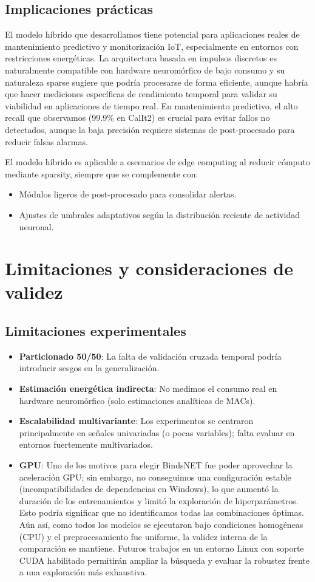 \subsection{Implicaciones prácticas}
El modelo híbrido que desarrollamos tiene potencial para aplicaciones reales de mantenimiento predictivo y monitorización IoT, especialmente en entornos con restricciones energéticas. La arquitectura basada en impulsos discretos es naturalmente compatible con hardware neuromórfico de bajo consumo y su naturaleza sparse sugiere que podría procesarse de forma eficiente, aunque habría que hacer mediciones específicas de rendimiento temporal para validar su viabilidad en aplicaciones de tiempo real. En mantenimiento predictivo, el alto recall que observamos (99.9\% en CalIt2) es crucial para evitar fallos no detectados, aunque la baja precisión requiere sistemas de post-procesado para reducir falsas alarmas.

El modelo híbrido es aplicable a escenarios de edge computing al reducir cómputo mediante sparsity, siempre que se complemente con:
\begin{itemize}
    \item Módulos ligeros de post-procesado para consolidar alertas.
    \item Ajustes de umbrales adaptativos según la distribución reciente de actividad neuronal.
\end{itemize}

\section{Limitaciones y consideraciones de validez}
\subsection{Limitaciones experimentales}
\begin{itemize}
    \item \textbf{Particionado 50/50}: La falta de validación cruzada temporal podría introducir sesgos en la generalización.
    \item \textbf{Estimación energética indirecta}: No medimos el consumo real en hardware neuromórfico (solo estimaciones analíticas de MACs).
    \item \textbf{Escalabilidad multivariante}: Los experimentos se centraron principalmente en señales univariadas (o pocas variables); falta evaluar en entornos fuertemente multivariados.
    \item \textbf{GPU}: Uno de los motivos para elegir BindsNET fue poder aprovechar la aceleración GPU; sin embargo, no conseguimos una configuración estable (incompatibilidades de dependencias en Windows), lo que aumentó la duración de los entrenamientos y limitó la exploración de hiperparámetros. Esto podría significar que no identificamos todas las combinaciones óptimas. Aún así, como todos los modelos se ejecutaron bajo condiciones homogéneas (CPU) y el preprocesamiento fue uniforme, la validez interna de la comparación se mantiene. Futuros trabajos en un entorno Linux con soporte CUDA habilitado permitirán ampliar la búsqueda y evaluar la robustez frente a una exploración más exhaustiva.
\end{itemize}

